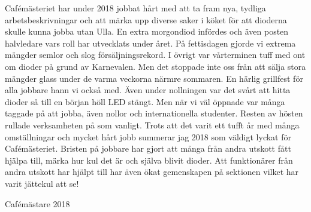 \documentclass[../_main/handlingar.tex]{subfiles}
\begin{document}

Cafémästeriet har under 2018 jobbat hårt med att ta fram nya, tydliga arbetsbeskrivningar och att
märka upp diverse saker i köket för att dioderna skulle kunna jobba utan Ulla. En extra morgondiod
infördes och även posten halvledare vars roll har utvecklats under året.
På fettisdagen gjorde vi extrema mängder semlor och slog försäljningsrekord. I övrigt var
vårterminen tuff med ont om dioder på grund av Karnevalen. Men det stoppade inte oss från att
sälja stora mängder glass under de varma veckorna närmre sommaren. En härlig grillfest för alla
jobbare hann vi också med.
Även under nollningen var det svårt att hitta dioder så till en början höll LED stängt. Men när vi väl
öppnade var många taggade på att jobba, även nollor och internationella studenter. Resten av
hösten rullade verksamheten på som vanligt.
Trots att det varit ett tufft år med många omställningar och mycket hårt jobb summerar jag 2018
som väldigt lyckat för Cafémästeriet. Bristen på jobbare har gjort att många från andra utskott fått
hjälpa till, märka hur kul det är och själva blivit dioder. Att funktionärer från andra utskott har hjälpt
till har även ökat gemenskapen på sektionen vilket har varit jättekul att se!




\begin{signatures}{1}
    \mvh
    \signature{Elin Johansson}{Cafémästare 2018}
\end{signatures}
\end{document}
